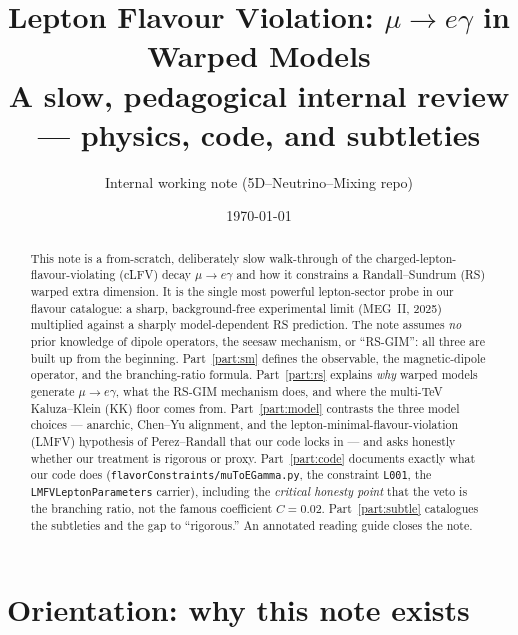 \documentclass[11pt]{article}
\title{\bf Lepton Flavour Violation: $\mu\to e\gamma$ in Warped Models\\[4pt]
\large A slow, pedagogical internal review --- physics, code, and subtleties}
\author{Internal working note (5D--Neutrino--Mixing repo)}
\date{\today}
\newcommand{\code}[1]{\texttt{#1}}
\theoremstyle{definition}
\begin{document}
\maketitle

\begin{abstract}
\noindent
This note is a from-scratch, deliberately slow walk-through of the
charged-lepton-flavour-violating (cLFV) decay $\mu\to e\gamma$ and how it
constrains a Randall--Sundrum (RS) warped extra dimension. It is the single most
powerful lepton-sector probe in our flavour catalogue: a sharp, background-free
experimental limit (MEG~II, 2025) multiplied against a sharply model-dependent
RS prediction. The note assumes \emph{no} prior knowledge of dipole operators,
the seesaw mechanism, or ``RS-GIM'': all three are built up from the beginning.
Part~\ref{part:sm} defines the observable, the magnetic-dipole operator, and the
branching-ratio formula. Part~\ref{part:rs} explains \emph{why} warped models
generate $\mu\to e\gamma$, what the RS-GIM mechanism does, and where the
multi-TeV Kaluza--Klein (KK) floor comes from. Part~\ref{part:model} contrasts
the three model choices --- anarchic, Chen--Yu alignment, and the
lepton-minimal-flavour-violation (LMFV) hypothesis of Perez--Randall that our
code locks in --- and asks honestly whether our treatment is rigorous or proxy.
Part~\ref{part:code} documents exactly what our code does
(\code{flavorConstraints/muToEGamma.py}, the constraint \code{L001}, the
\code{LMFVLeptonParameters} carrier), including the \emph{critical honesty point}
that the veto is the branching ratio, not the famous coefficient $C=0.02$.
Part~\ref{part:subtle} catalogues the subtleties and the gap to ``rigorous.'' An
annotated reading guide closes the note.
\end{abstract}

\tableofcontents

\part*{Orientation: why this note exists}
\end{document}
